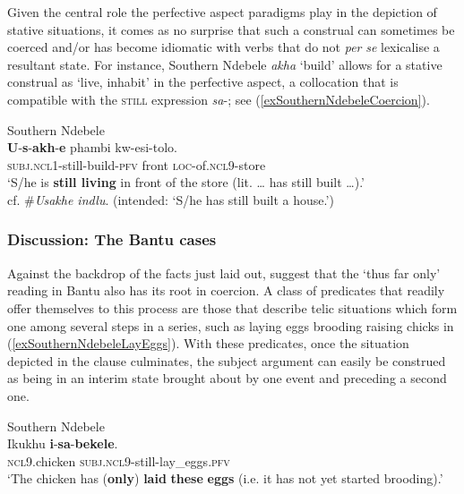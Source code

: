 Given the central role the perfective aspect paradigms play in the depiction of stative situations, it comes as no surprise that such a construal can sometimes be coerced and/or has become idiomatic with verbs that do not \textit{per} \textit{se} lexicalise a resultant state. For instance, Southern Ndebele \textit{akha} \lq build' allows for a stative construal as \lq live, inhabit' in the perfective aspect, a collocation that is compatible with the \textsc{still} expression \mbox{\textit{sa}-}; see (\ref{exSouthernNdebeleCoercion}).

\begin{exe}
	\ex Southern Ndebele \label{exSouthernNdebeleCoercion}\\
	\gll \textbf{U}-\textbf{s}-\textbf{akh}-\textbf{e} phambi kw-esi-tolo.\\
	\textsc{subj}.\textsc{ncl}1-still-build-\textsc{pfv} front \textsc{loc}-of.\textsc{ncl}9-store\\
	\glt \lq S/he is \textbf{still living} in front of the store (lit. … has still built …).' \\
	cf. \#{}\textit{Usakhe indlu}. (intended: \lq S/he has still built a house.')\\\parencite[275]{CranePersohn2021}
\end{exe}

\subsubsection{Discussion: The Bantu cases} Against the backdrop of the facts just laid out, \textcite{CranePersohn2021} suggest that the \lq thus far only' reading in Bantu also has its root in coercion. A class of predicates that readily offer themselves to this process are those that describe telic situations which form one among several steps in a series, such as laying eggs \Rightarrow{ }brooding \Rightarrow{ }raising chicks in (\ref{exSouthernNdebeleLayEggs}). With these predicates, once the situation depicted in the clause culminates, the subject argument can easily be construed as being in an interim state brought about by one event and preceding a second one.

\begin{exe}
	\ex Southern Ndebele\label{exSouthernNdebeleLayEggs}\\
	 \gll Ikukhu \textbf{i}-\textbf{sa}-\textbf{bekele}.\\
	 \textsc{ncl}9.chicken \textsc{subj}.\textsc{ncl}9-still-lay\_eggs.\textsc{pfv}\\
	 \glt \lq The chicken has (\textbf{only}) \textbf{laid} \textbf{these} \textbf{eggs} (i.e. it has not yet started brooding).' \parencite[275]{CranePersohn2021}
\end{exe} 


